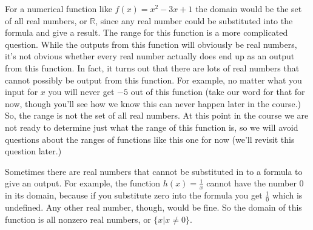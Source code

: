 

\bigskip

For a numerical function like $f(x)=x^2-3x+1$ the domain would be the set of all real numbers, or $\mathbb{R}$, since any real number could be substituted into the formula and give a result.  The range for this function is a more complicated question.  While the outputs from this function will obviously be real numbers, it’s not obvious whether every real number actually does end up as an output from this function. In fact, it turns out that there are lots of real numbers that cannot
possibly be output from this function. For example, no matter what you input for $x$ you will never get $-5$ out of this function (take our word for that for now, though you’ll see how we know this can never happen later in the course.) So, the range is not the set of all real numbers. At this point in the course we are not ready to determine just what the range of this function is, so we will avoid questions about the ranges of functions like this one for now (we’ll revisit this question later.)



Sometimes there are real numbers that cannot be substituted in to a formula to give an output.  For example, the function $h(x)=\frac{1}{x}$ cannot have the number $0$ in its domain, because if you substitute zero into the formula you get $\frac{1}{0}$ which is undefined. Any other real number, though, would be fine. So the domain of this function is all nonzero real numbers, or $\{x \vert x\ne 0\}$.\\

